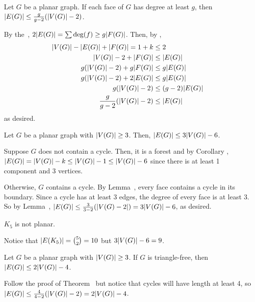 \documentclass[class=math239,notes,tikz]{agony}
\begin{document}
\begin{lemma}[7.5.2]\label{lem:752}
  Let $G$ be a planar graph. If each face of $G$ has degree at least $g$,
  then $\abs{E(G)} \leq \frac{g}{g-2}(\abs{V(G)}-2)$.
\end{lemma}
\begin{prf}
  By the~, $2\abs{E(G)} = \sum \deg(f) \geq g \abs{F(G)}$.
  Then, by ,
  \begin{align*}
    \abs{V(G)} - \abs{E(G)} + \abs{F(G)} = 1 + k & \leq 2               \\
    \abs{V(G)} - 2 + \abs{F(G)}                  & \leq \abs{E(G)}      \\
    g(\abs{V(G)} - 2) + g\abs{F(G)}              & \leq g\abs{E(G)}     \\
    g(\abs{V(G)} - 2) + 2\abs{E(G)}              & \leq g\abs{E(G)}     \\
    g(\abs{V(G)} - 2)                            & \leq (g-2)\abs{E(G)} \\
    \frac{g}{g-2}(\abs{V(G)} - 2)                & \leq \abs{E(G)}
  \end{align*}
  as desired.
\end{prf}

\begin{theorem}[7.5.3]\label{thm:753}
  Let $G$ be a planar graph with $\abs{V(G)} \geq 3$.
  Then, $\abs{E(G)} \leq 3\abs{V(G)} - 6$.
\end{theorem}
\begin{prf}
  Suppose $G$ does not contain a cycle.
  Then, it is a forest and by Corollary ,
  $\abs{E(G)} = \abs{V(G)} - k \leq \abs{V(G)} - 1 \leq \abs{V(G)} - 6$
  since there is at least 1 component and 3 vertices.

  Otherwise, $G$ contains a cycle.
  By Lemma~, every face contains a cycle in its boundary.
  Since a cycle has at least 3 edges, the degree of every face is at least 3.
  So by Lemma~, $\abs{E(G)} \leq \frac{3}{3-2}(\abs{V(G)-2}) = 3\abs{V(G)} - 6$,
  as desired.
\end{prf}
\begin{corollary}[7.5.4]
  $K_5$ is not planar.
\end{corollary}
\begin{prf}
  Notice that $\abs{E(K_5)} = \binom{5}{2} = 10$ but $3\abs{V(G)} - 6 = 9$.
\end{prf}

\begin{theorem}[7.5.6]
  Let $G$ be a planar graph with $\abs{V(G)} \geq 3$.
  If $G$ is triangle-free, then $\abs{E(G)} \leq 2\abs{V(G)}-4$.
\end{theorem}
\begin{prf}
  Follow the proof of Theorem~
  but notice that cycles will have length at least 4,
  so $\abs{E(G)} \leq \frac{4}{4-2}(\abs{V(G)} - 2) = 2\abs{V(G)} - 4$.
\end{prf}
\end{document}
